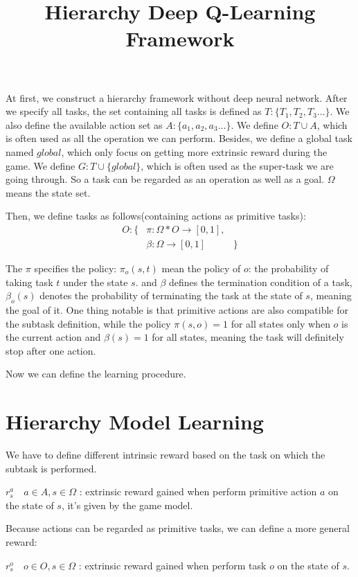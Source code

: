 \documentclass{article}
\begin{document}
\title{Hierarchy Deep Q-Learning Framework}
\maketitle
At first, we construct a hierarchy framework without deep neural network.
After we specify all tasks, the set containing all tasks is defined as $T:\{T_1,T_2,T_3...\}$. We also define the available action set as $A:\{a_1,a_2,a_3...\}$. We define $O:T\cup A$, which is often used as all the operation we can perform. Besides, we define a global task named $global$, which only focus on getting more extrinsic reward during the game. We define $G:T\cup \{global\}$, which is often used as the super-task we are going through. So a task can be regarded as an operation as well as a goal. $\Omega$ means the state set. 

Then, we define tasks as follows(containing actions as primitive tasks):
\begin{eqnarray}
O:\{& \pi : \Omega * O\rightarrow [0,1],&\\
     \nonumber & \beta : \Omega \rightarrow [0,1]&\}
\end{eqnarray}

The $\pi$ specifies the policy: $\pi_o(s,t)$ mean the policy of $o$: the probability of taking task $t$ under the state $s$. and $\beta$ defines the termination condition of a task, $\beta_o(s)$ denotes the probability of terminating the task at the state of $s$, meaning the goal of it.
One thing notable is that primitive actions are also compatible for the subtask definition, while the policy $\pi(s,o)=1$ for all states only when $o$ is the current action and $\beta(s)=1$ for all states, meaning the task will definitely stop after one action.

Now we can define the learning procedure.

\section{Hierarchy Model Learning}
We have to define different intrinsic reward based on the task on which the subtask is performed.

$r^a_s \quad a\in{A},s\in{\Omega}$ : extrinsic reward gained when perform primitive action $a$ on the state of $s$, it's given by the game model.

Because actions can be regarded as primitive tasks, we can define a more general reward:

$r^o_s \quad o\in{O},s\in{\Omega}$ : extrinsic reward gained when perform task $o$ on the state of $s$.
\end{document}
